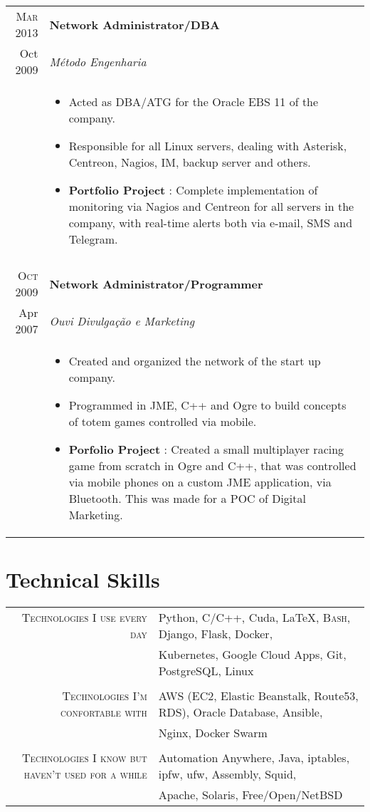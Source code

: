 \documentclass[10pt,a4paper]{article}
\newcommand{\br}{\\\multicolumn{2}{c}{}}
\begin{document}
\begin{tabular}{r|p{16cm}}
    \textsc{Mar 2013} & \textbf{Network Administrator/DBA} \\
    Oct 2009          & \textit{Método Engenharia} \\ &
    \begin{itemize}
    	\item Acted as DBA/ATG for the Oracle EBS 11 of the company.
        \item Responsible for all Linux servers, dealing with Asterisk, Centreon, Nagios, IM, backup server and others.
        \item \textbf{Portfolio Project} : Complete implementation of monitoring via Nagios and Centreon for all servers in the company, with real-time alerts both via e-mail, SMS and Telegram.
    \end{itemize} \br\\

    \textsc{Oct 2009} & \textbf{Network Administrator/Programmer}  \\
    Apr 2007          & \textit{Ouvi Divulgação e Marketing} \\ &
    \begin{itemize}
        \item Created and organized the network of the start up company.
        \item Programmed in JME, C++ and Ogre to build concepts of totem games controlled via mobile.
        \item \textbf{Porfolio Project} : Created a small multiplayer racing game from scratch in Ogre and C++, that was controlled via mobile phones on a custom JME application, via Bluetooth. This was made for a POC of Digital Marketing.
    \end{itemize}
\end{tabular}

\section{Technical Skills}
\begin{tabular}{r|p{16cm}}
    \textsc{\small Technologies I use every day} &
    Python, 
    C/C++, 
    Cuda,
    \LaTeX{}, 
    \textsc{Bash},
    Django, 
    Flask, 
    Docker, \\
    & Kubernetes, 
    Google Cloud Apps, 
    Git, 
    PostgreSQL, 
    Linux \br\\

    \textsc{\small Technologies I'm confortable with} &
    AWS (EC2, Elastic Beanstalk, Route53, RDS), 
    Oracle Database, 
    Ansible, \\
    & Nginx, 
    Docker Swarm\br\\

    \textsc{\small Technologies I know but haven't used for a while} &
    Automation Anywhere,
        Java, 
        iptables, 
        ipfw, 
        ufw, 
        Assembly, 
        Squid, \\
        & Apache, 
        Solaris, 
        Free/Open/NetBSD
\end{tabular}
\end{document}
